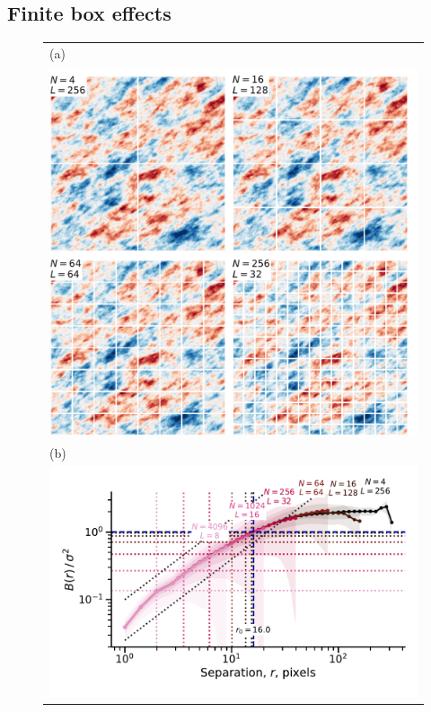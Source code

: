 \documentclass[fleqn,usenatbib, useAMS, a4paper]{mnras}
\begin{document}
\subsection{Finite box effects}
\label{sec:finite-box-effects}

\begin{figure}
  \begin{tabular}{@{} l @{}}
    (a)\\
    \includegraphics[width=\linewidth]{Figures/fake-finite-box-images}
    \\[\bigskipamount]
    (b)\\
    \includegraphics[width=\linewidth]{Figures/fake-finite-box-strucfunc2}

\end{tabular}
\end{figure}
\end{document}
